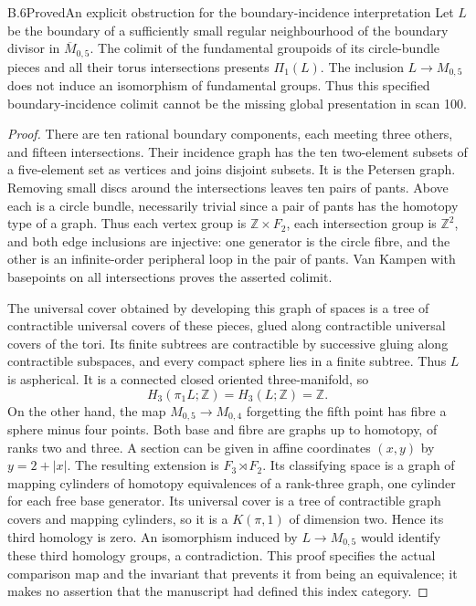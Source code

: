 \begin{result}{B.6}{Proved}{An explicit obstruction for the boundary-incidence interpretation}
Let $L$ be the boundary of a sufficiently small regular
neighbourhood of the boundary divisor in $\overline M_{0,5}$.  The
colimit of the fundamental groupoids of its circle-bundle pieces
and all their torus intersections presents $\Pi_1(L)$.  The inclusion
$L\to M_{0,5}$ does not induce an isomorphism of fundamental groups.
Thus this specified boundary-incidence colimit cannot be the
missing global presentation in scan 100.
\end{result}
\begin{proof}
There are ten rational boundary components, each meeting three
others, and fifteen intersections.  Their incidence graph has the
ten two-element subsets of a five-element set as vertices and
joins disjoint subsets.  It is the Petersen graph.  Removing small
discs around the intersections leaves ten pairs of pants.  Above
each is a circle bundle, necessarily trivial since a pair of pants
has the homotopy type of a graph.  Thus each vertex group is
$\mathbb Z\times F_2$, each intersection group is $\mathbb Z^2$,
and both edge inclusions are injective: one generator is the circle
fibre, and the other is an infinite-order peripheral loop in the
pair of pants.  Van Kampen with basepoints on all intersections
proves the asserted colimit.

The universal cover obtained by developing this graph of spaces is
a tree of contractible universal covers of these pieces, glued
along contractible universal covers of the tori.  Its finite
subtrees are contractible by successive gluing along contractible
subspaces, and every compact sphere lies in a finite subtree.
Thus $L$ is aspherical.  It is a connected closed oriented
three-manifold, so
\[
 H_3(\pi_1L;\mathbb Z)=H_3(L;\mathbb Z)=\mathbb Z.
\]
On the other hand, the map
$M_{0,5}\to M_{0,4}$ forgetting the fifth point has fibre a sphere
minus four points.  Both base and fibre are graphs up to homotopy,
of ranks two and three.  A section can be given in affine
coordinates $(x,y)$ by $y=2+|x|$.
The resulting extension is $F_3\rtimes F_2$.  Its classifying space
is a graph of mapping cylinders of homotopy equivalences of a
rank-three graph, one cylinder for each free base generator.
Its universal cover is a tree of contractible graph covers and
mapping cylinders, so it is a $K(\pi,1)$ of dimension two.  Hence its third homology is zero.  An isomorphism induced by
$L\to M_{0,5}$ would identify these third homology groups, a
contradiction.  This proof specifies the actual comparison map and
the invariant that prevents it from being an equivalence; it makes
no assertion that the manuscript had defined this index category.
\end{proof}

